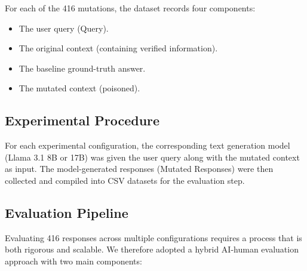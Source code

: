 \documentclass[
    a4paper,
    man,
    floatsintext
]{glossaPX2}
\begin{document}
For each of the 416 mutations, the dataset records four components:

\begin{itemize}
\item The user query (Query).
\item The original context (containing verified information).
\item The baseline ground-truth answer.
\item The mutated context (poisoned).
\end{itemize}

\subsection{Experimental Procedure}
For each experimental configuration, the corresponding text generation model (Llama 3.1 8B or 17B) was given the user query along with the mutated context as input. The model-generated responses (Mutated Responses) were then collected and compiled into CSV datasets for the evaluation step.

\subsection{Evaluation Pipeline}
Evaluating 416 responses across multiple configurations requires a process that is both rigorous and scalable. We therefore adopted a hybrid AI-human evaluation approach with two main components:
\end{document}
